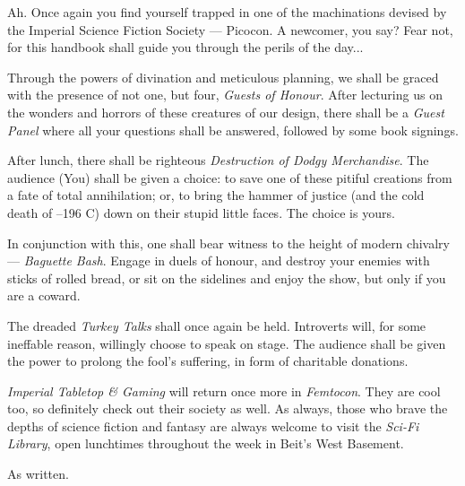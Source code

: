 Ah. Once again you find yourself trapped in one of the machinations devised by the Imperial Science Fiction Society --- Picocon. A newcomer, you say? Fear not, for this handbook shall guide you through the perils of the day...

Through the powers of divination and meticulous planning, we shall be graced with the presence of not one, but four, \emph{Guests of Honour}. After lecturing us on the wonders and horrors of these creatures of our design, there shall be a \emph{Guest Panel} where all your questions shall be answered, followed by some book signings. 

After lunch, there shall be righteous \emph{Destruction of Dodgy Merchandise}. The audience (You) shall be given a choice: to save one of these pitiful creations from a fate of total annihilation; or, to bring the hammer of justice (and the cold death of --196 C) down on their stupid little faces. The choice is yours.

In conjunction with this, one shall bear witness to the height of modern chivalry --- \emph{Baguette Bash}. Engage in duels of honour, and destroy your enemies with sticks of rolled bread, or sit on the sidelines and enjoy the show, but only if you are a coward.

The dreaded \emph{Turkey Talks} shall once again be held. Introverts will, for some ineffable reason, willingly choose to speak on stage. The audience shall be given the power to prolong the fool's suffering, in form of charitable donations.

\emph{Imperial Tabletop \& Gaming} will return once more in \emph{Femtocon}. They are cool too, so definitely check out their society as well. As always, those who brave the depths of science fiction and fantasy are always welcome to visit the \emph{Sci-Fi Library}, open lunchtimes throughout the week in Beit's West Basement.

As written.
